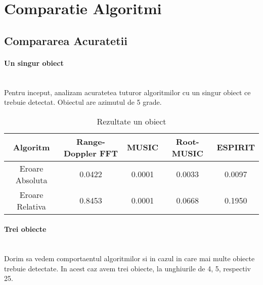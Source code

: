 \documentclass{article}
\begin{document}
\section{Comparatie Algoritmi}

\subsection{Compararea Acuratetii}

\paragraph{Un singur obiect} ~\\

Pentru inceput, analizam acuratetea tuturor algoritmilor cu un singur obiect ce trebuie detectat.
Obiectul are azimutul de 5 grade.

\begin{table}[h]
	\centering
	\begin{tabular}{|c|c|c|c|c|}
		\hline
		Algoritm & Range-Doppler FFT & MUSIC & Root-MUSIC & ESPIRIT \\
		\hline
		Eroare Absoluta & 0.0422 & \text{\textless} 0.0001 & 0.0033 & 0.0097 \\
		\hline
		Eroare Relativa & 0.8453 & \text{\textless} 0.0001 &  0.0668 & 0.1950 \\
		\hline
	\end{tabular}
	\caption{Rezultate un obiect}
\end{table}

\paragraph{Trei obiecte} ~\\

Dorim sa vedem comportaentul algoritmilor si in cazul in care mai multe obiecte trebuie detectate.
In acest caz avem trei obiecte, la unghiurile de 4, 5, respectiv 25.
\end{document}
